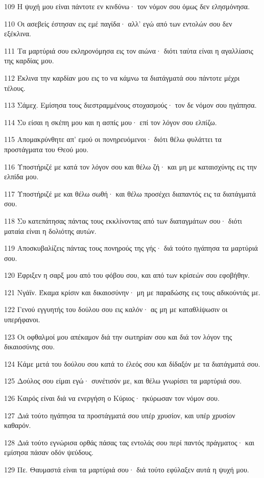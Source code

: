 \par 109 Η ψυχή μου είναι πάντοτε εν κινδύνω· τον νόμον σου όμως δεν ελησμόνησα.
\par 110 Οι ασεβείς έστησαν εις εμέ παγίδα· αλλ' εγώ από των εντολών σου δεν εξέκλινα.
\par 111 Τα μαρτύριά σου εκληρονόμησα εις τον αιώνα· διότι ταύτα είναι η αγαλλίασις της καρδίας μου.
\par 112 Έκλινα την καρδίαν μου εις το να κάμνω τα διατάγματά σου πάντοτε μέχρι τέλους.
\par 113 Σάμεχ. Εμίσησα τους διεστραμμένους στοχασμούς· τον δε νόμον σου ηγάπησα.
\par 114 Συ είσαι η σκέπη μου και η ασπίς μου· επί τον λόγον σου ελπίζω.
\par 115 Απομακρύνθητε απ' εμού οι πονηρευόμενοι· διότι θέλω φυλάττει τα προστάγματα του Θεού μου.
\par 116 Υποστήριζέ με κατά τον λόγον σου και θέλω ζή· και μη με καταισχύνης εις την ελπίδα μου.
\par 117 Υποστήριζέ με και θέλω σωθή· και θέλω προσέχει διαπαντός εις τα διατάγματά σου.
\par 118 Συ κατεπάτησας πάντας τους εκκλίνοντας από των διαταγμάτων σου· διότι ματαία είναι η δολιότης αυτών.
\par 119 Αποσκυβαλίζεις πάντας τους πονηρούς της γής· διά τούτο ηγάπησα τα μαρτύριά σου.
\par 120 Έφριξεν η σαρξ μου από του φόβου σου, και από των κρίσεών σου εφοβήθην.
\par 121 Νγάϊν. Έκαμα κρίσιν και δικαιοσύνην· μη με παραδώσης εις τους αδικούντάς με.
\par 122 Γενού εγγυητής του δούλου σου εις καλόν· ας μη με καταθλίψωσιν οι υπερήφανοι.
\par 123 Οι οφθαλμοί μου απέκαμον διά την σωτηρίαν σου και διά τον λόγον της δικαιοσύνης σου.
\par 124 Κάμε μετά του δούλου σου κατά το έλεός σου και δίδαξόν με τα διατάγματά σου.
\par 125 Δούλος σου είμαι εγώ· συνέτισόν με, και θέλω γνωρίσει τα μαρτύριά σου.
\par 126 Καιρός είναι διά να ενεργήση ο Κύριος· ηκύρωσαν τον νόμον σου.
\par 127 Διά τούτο ηγάπησα τα προστάγματά σου υπέρ χρυσίον, και υπέρ χρυσίον καθαρόν.
\par 128 Διά τούτο εγνώρισα ορθάς πάσας τας εντολάς σου περί παντός πράγματος· και εμίσησα πάσαν οδόν ψεύδους.
\par 129 Πε. Θαυμαστά είναι τα μαρτύριά σου· διά τούτο εφύλαξεν αυτά η ψυχή μου.
